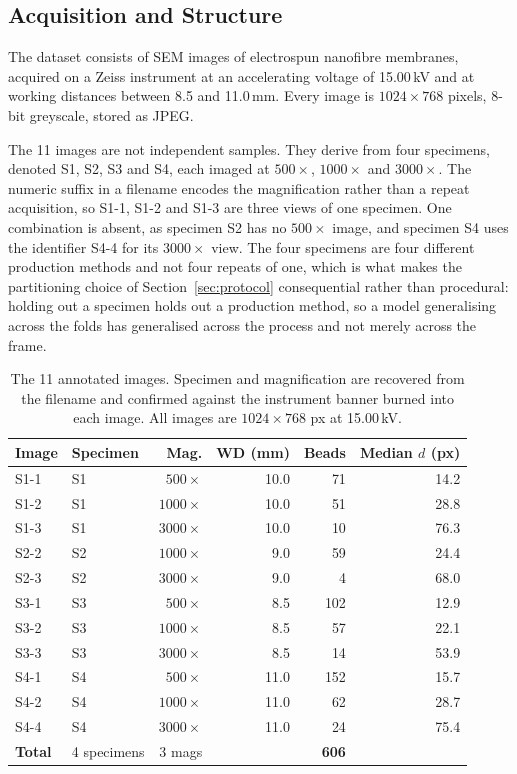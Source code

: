 \subsection{Acquisition and Structure}

The dataset consists of SEM images of electrospun nanofibre membranes, acquired on
a Zeiss instrument at an accelerating voltage of 15.00\,kV and at working
distances between 8.5 and 11.0\,mm. Every image is $1024 \times 768$ pixels,
8-bit greyscale, stored as JPEG.

The 11 images are not independent samples. They derive from four specimens,
denoted S1, S2, S3 and S4, each imaged at $500\times$, $1000\times$ and
$3000\times$. The numeric suffix in a filename encodes the magnification rather
than a repeat acquisition, so S1-1, S1-2 and S1-3 are three views of one specimen.
One combination is absent, as specimen S2 has no $500\times$ image, and
specimen S4 uses the identifier S4-4 for its $3000\times$ view. The four specimens
are four different production methods and not four repeats of one, which is what
makes the partitioning choice of Section~\ref{sec:protocol} consequential rather
than procedural: holding out a specimen holds out a production method, so a model
generalising across the folds has generalised across the process and not merely
across the frame.

\begin{table}[htbp]
    \centering

    \caption{The 11 annotated images. Specimen and magnification are recovered
    from the filename and confirmed against the instrument banner burned into each
    image. All images are $1024 \times 768$ px at 15.00\,kV.}
    \label{tab:dataset}
    \begin{tabular}{llrrrr}
        \toprule
        Image & Specimen & Mag. & WD (mm) & Beads & Median $d$ (px) \\
        \midrule
        S1-1 & S1 & $500\times$  & 10.0 & 71  & 14.2 \\
        S1-2 & S1 & $1000\times$ & 10.0 & 51  & 28.8 \\
        S1-3 & S1 & $3000\times$ & 10.0 & 10  & 76.3 \\
        \midrule
        S2-2 & S2 & $1000\times$ & 9.0  & 59  & 24.4 \\
        S2-3 & S2 & $3000\times$ & 9.0  & 4   & 68.0 \\
        \midrule
        S3-1 & S3 & $500\times$  & 8.5  & 102 & 12.9 \\
        S3-2 & S3 & $1000\times$ & 8.5  & 57  & 22.1 \\
        S3-3 & S3 & $3000\times$ & 8.5  & 14  & 53.9 \\
        \midrule
        S4-1 & S4 & $500\times$  & 11.0 & 152 & 15.7 \\
        S4-2 & S4 & $1000\times$ & 11.0 & 62  & 28.7 \\
        S4-4 & S4 & $3000\times$ & 11.0 & 24  & 75.4 \\
        \midrule
        \textbf{Total} & 4 specimens & 3 mags & & \textbf{606} & \\
        \bottomrule
    \end{tabular}
\end{table}

